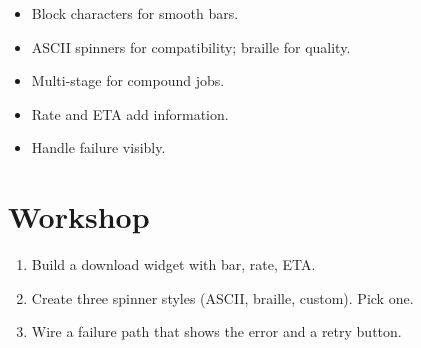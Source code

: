\begin{recap}
\begin{itemize}[leftmargin=*]
  \item Block characters for smooth bars.
  \item ASCII spinners for compatibility; braille for
    quality.
  \item Multi-stage for compound jobs.
  \item Rate and ETA add information.
  \item Handle failure visibly.
\end{itemize}
\end{recap}

\section*{Workshop}

\begin{enumerate}[leftmargin=*]
  \item Build a download widget with bar, rate, ETA.
  \item Create three spinner styles (ASCII, braille,
    custom). Pick one.
  \item Wire a failure path that shows the error and a
    retry button.
\end{enumerate}
